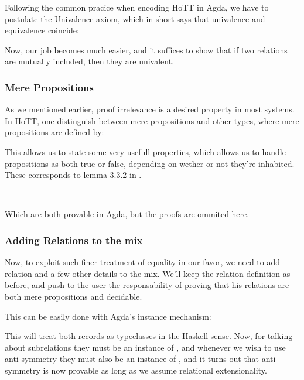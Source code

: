   Following the common pracice when encoding HoTT in Agda, we have to postulate the Univalence
  axiom, which in short says that univalence and equivalence coincide:
  
  
  Now, our job becomes much easier, and it suffices to show that if two relations are
  mutually included, then they are univalent.
  
  \subsubsection{Mere Propositions}
  
  As we mentioned earlier, proof irrelevance is a desired property in most systems. In HoTT,
  one distinguish between mere propositions and other types, where mere propositions
  are defined by:
  
  
  This allows us to state some very usefull properties, which allows us to handle propositions
  as both true or false, depending on wether or not they're inhabited. These corresponds to
  lemma 3.3.2 in \cite{hottbook}.
  
  \\
  
  Which are both provable in Agda, but the proofs are ommited here.
  
  \subsubsection{Adding Relations to the mix}
  
  Now, to exploit such finer treatment of equality in our favor, we need to add
  relation and a few other details to the mix. We'll keep the relation definition
  as before, and push to the user the responsability of proving that his relations
  are both mere propositions and decidable.
  
  This can be easily done with Agda's instance mechanism:
  
  
  This will treat both records as typeclasses in the Haskell sense. Now, for talking about
  subrelations they must be an instance of , and whenever we wish to use anti-symmetry
  they must also be an instance of , and it turns out that anti-symmetry is now
  provable as long as we assume relational extensionality.
  
